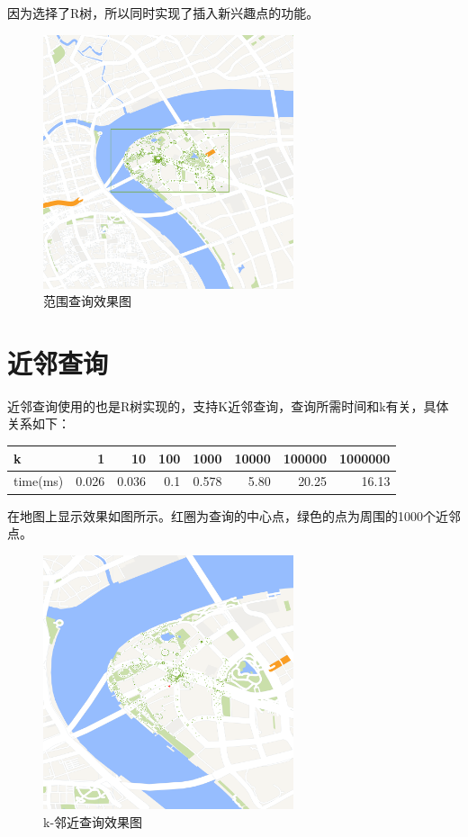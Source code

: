 \documentclass[10pt]{scrartcl}
\begin{document}
因为选择了R树，所以同时实现了插入新兴趣点的功能。

\begin{figure}[htbp] 
\centering\includegraphics[width=2.9in]{querybox} 
\caption{范围查询效果图}\label{fig:3} 
\end{figure} 

\section{近邻查询}
近邻查询使用的也是R树实现的，支持K近邻查询，查询所需时间和k有关，具体关系如下：\\
\begin{tabular}{|l|r|r|r|r|r|r|r|}
\hline
k & 1 & 10 & 100 & 1000 & 10000 & 100000 & 1000000 \\
\hline
time(ms) & 0.026 & 0.036 & 0.1 & 0.578 & 5.80 & 20.25 & 16.13 \\
\hline
\end{tabular}

在地图上显示效果如图所示。红圈为查询的中心点，绿色的点为周围的1000个近邻点。
\begin{figure}[htbp] 
\centering\includegraphics[width=2.9in]{nearest} 
\caption{k-邻近查询效果图}\label{fig:4} 
\end{figure} 
\end{document}
